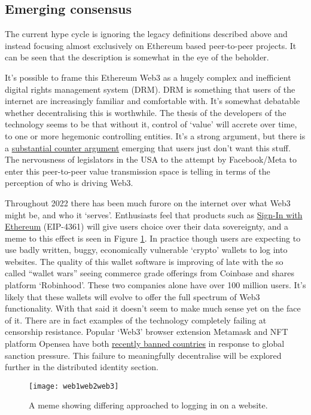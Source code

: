 \subsection{Emerging consensus}
The current hype cycle is ignoring the legacy definitions described above and instead focusing almost exclusively on Ethereum based peer-to-peer projects. It can be seen that the description is somewhat in the eye of the beholder.\par
It's possible to frame this Ethereum Web3 as a hugely complex and inefficient digital rights management system (DRM). DRM is something that users of the internet are increasingly familiar and comfortable with. It's somewhat debatable whether decentralising this is worthwhile. The thesis of the developers of the technology seems to be that without it, control of `value' will accrete over time, to one or more hegemonic controlling entities. It's a strong argument, but there is a \href{https://moxie.org/2022/01/07/web3-first-impressions.html}{substantial counter argument} emerging that users just don't want this stuff. The nervousness of legislators in the USA to the attempt by Facebook/Meta to enter this peer-to-peer value transmission space is telling in terms of the perception of who is driving Web3.\par
Throughout 2022 there has been much furore on the internet over what Web3 might be, and who it `serves'. Enthusiasts feel that products such as \href{https://blog.spruceid.com/sign-in-with-ethereum-is-a-game-changer-part-1/}{Sign-In with Ethereum} (EIP-4361) will give users choice over their data sovereignty, and a meme to this effect is seen in Figure \ref{fig:web1web2web3}. In practice though users are expecting to use badly written, buggy, economically vulnerable `crypto' wallets to log into websites. The quality of this wallet software is improving of late with the so called ``wallet wars'' seeing commerce grade offerings from Coinbase and shares platform `Robinhood'. These two companies alone have over 100 million users. It's likely that these wallets will evolve to offer the full spectrum of Web3 functionality. With that said it doesn't seem to make much sense yet on the face of it. There are in fact examples of the technology completely failing at censorship resistance. Popular `Web3' browser extension Metamask and NFT platform Opensea have both \href{https://www.forbes.com/sites/stevenehrlich/2022/03/03/iranian-venezuela-users-abruptly-dropped-from-major-crypto-platforms-as-russian-sanctions-grow/?sh=22bcabc470b0}{recently banned countries} in response to global sanction pressure. This failure to meaningfully decentralise will be explored further in the distributed identity section. \par
\begin{figure}
  \centering
   \texttt{[image: web1web2web3]}
 \caption{A meme showing differing approached to logging in on a website.}
 \label{fig:web1web2web3}
\end{figure}

